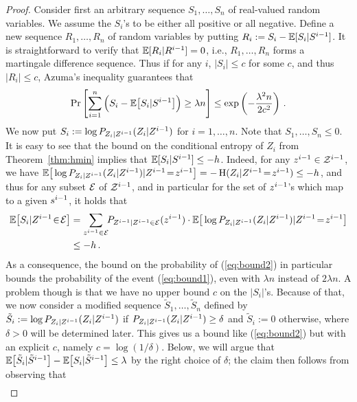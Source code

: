 \begin{proof}
Consider first an arbitrary sequence $S_1,\ldots,S_n$ of real-valued
random variables. We assume the $S_i$'s to be either all positive or
all negative. Define a new sequence $R_1,\ldots,R_n$ of random
variables by putting $R_i := S_i - \mathbb{E}[S_i | S^{i-1}]$. It is
straightforward to verify that $\mathbb{E}[R_i | R^{i-1}] = 0$, i.e.,
$R_1,\ldots,R_n$ forms a martingale difference sequence. Thus if for any $i$,
$|S_i| \leq c$ for some $c$, and thus $|R_i| \leq c$,
Azuma's inequality guarantees that
\begin{equation}\label{eq:bound2}
\Pr\left[\sum_{i=1}^n \Big(S_i - \mathbb{E}\big[S_i | S^{i-1}\big]\Big) \geq \lambda n\right] \leq \exp\left(-\frac{\lambda^2 n}{2 c^2}\right) \, .
\end{equation}
We now put $S_i := \log P_{Z_i | Z^{i-1}}(Z_i | Z^{i-1})$ for
$i=1,\ldots,n$. Note that $S_1,\ldots,S_n \leq 0$. It is easy to see that
the bound on the conditional entropy of $Z_i$ from
Theorem~\ref{thm:hmin} implies that $\mathbb{E}[S_i | S^{i-1}] \leq -h$.  Indeed,
for any $z^{i-1} \in \mathcal{Z}^{i-1}$, we have $\mathbb{E}\big[\log
P_{Z_i | Z^{i-1}}(Z_i | Z^{i-1}) | Z^{i-1}\!=\!z^{i-1}\big] = -
\operatorname{H}(Z_i | Z^{i-1}\!=\!z^{i-1}) \leq - h$, and thus for any subset $\mathcal{E}$
of $\mathcal{Z}^{i-1}$, and in particular for the set of $z^{i-1}$'s
which map to a given $s^{i-1}$, it holds that
\begin{align} \nonumber
\mathbb{E}\big[S_i | Z^{i-1}\!\in\!\mathcal{E}\big] &=
\sum_{z^{i-1} \in \mathcal{E}}\!\! P_{Z^{i-1} | Z^{i-1}\in\mathcal{E}}(z^{i-1}) \cdot
  \mathbb{E}\big[\log P_{Z_i | Z^{i-1}}(Z_i | Z^{i-1}) |
  Z^{i-1}\!=\!z^{i-1}\big]\\
 &\leq - h \, . \label{eq:bound3}
\end{align}
As a consequence, the bound on the probability of (\ref{eq:bound2}) in
particular bounds the probability of the event (\ref{eq:bound1}), even
with $\lambda n$ instead of $2 \lambda n$. A problem though is that we
have no upper bound $c$ on the $|S_i|$'s.  Because of that, we now
consider a modified sequence $\tilde{S}_1,\ldots,\tilde{S}_n$ defined
by $\tilde{S}_i := \log P_{Z_i | Z^{i-1}}(Z_i | Z^{i-1})$ if
$P_{Z_i | Z^{i-1}}(Z_i | Z^{i-1}) \geq \delta$ and
$\tilde{S}_i := 0$ otherwise, where $\delta > 0$ will be determined
later.  This gives us a bound like (\ref{eq:bound2}) but with an
explicit $c$, namely $c = \log(1/\delta)$. Below, we will argue that
$\mathbb{E}\big[\tilde{S}_i | \tilde{S}^{i-1}\big]-\mathbb{E}\big[S_i |
\tilde{S}^{i-1}\big] \leq \lambda$ by the right choice of $\delta$;
the claim then follows from observing that
\begin{align*}

\end{align*}
\end{proof}
